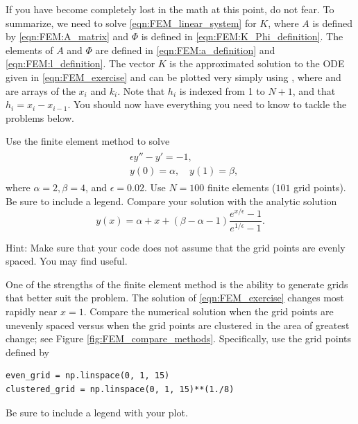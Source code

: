 If you have become completely lost in the math at this point, do not fear.
To summarize, we need to solve \ref{eqn:FEM_linear_system} for $K$, where $A$ is defined by \ref{eqn:FEM:A_matrix} and $\Phi$ is defined in \ref{eqn:FEM:K_Phi_definition}.
The elements of $A$ and $\Phi$ are defined in \ref{eqn:FEM:a_definition} and \ref{eqn:FEM:l_definition}.
The vector $K$ is the approximated solution to the ODE given in \ref{eqn:FEM_exercise} and can be plotted very simply using , where  and  are arrays of the \(x_i\) and \(k_i\).
Note that $h_i$ is indexed from 1 to $N+1$, and that $h_i=x_i-x_{i-1}$.
You should now have everything you need to know to tackle the problems below.


\begin{problem}
Use the finite element method to solve
\begin{align}
	\begin{split}
	&{ }\epsilon y'' - y' = -1,\\
	&{ }y(0) = \alpha, \quad y(1) = \beta,
	\end{split} \label{eqn:FEM_exercise}
\end{align}
where $\alpha = 2, \beta = 4$, and $\epsilon = 0.02$.
Use $N = 100$ finite elements ($101$ grid points).
Be sure to include a legend.
Compare your solution with the analytic solution
\[y(x) = \alpha + x + (\beta - \alpha - 1 ) \frac{e^{x/\epsilon} -1}{e^{1/\epsilon} -1}.\]

Hint: Make sure that your code does not assume that the grid points are evenly spaced.
You may find  useful.
\end{problem}

\begin{problem}
One of the strengths of the finite element method is the ability to generate grids that better suit the problem.
The solution of \eqref{eqn:FEM_exercise} changes most rapidly near $x = 1$.
Compare the numerical solution when the grid points are unevenly spaced versus when the grid points are clustered in the area of greatest change; see Figure \ref{fig:FEM_compare_methods}.
Specifically, use the grid points defined by
\begin{lstlisting}
even_grid = np.linspace(0, 1, 15)
clustered_grid = np.linspace(0, 1, 15)**(1./8)
\end{lstlisting}
Be sure to include a legend with your plot.
\end{problem}

